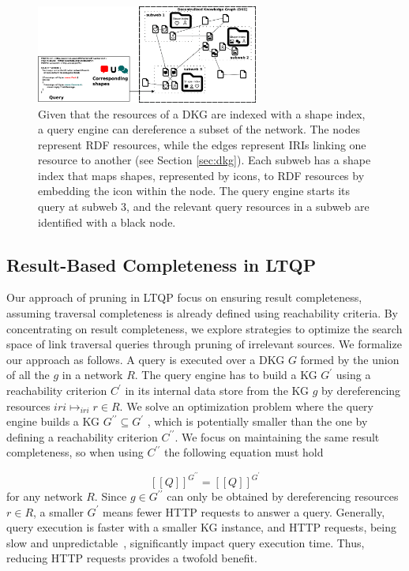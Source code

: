 \begin{figure}
   \centering
   \includegraphics[width=0.65\textwidth]{figure/dkg.png}
   \caption{
      Given that the resources of a DKG are indexed with a shape index, a query engine can dereference a subset of the network.
      The nodes represent RDF resources, while the edges represent IRIs linking one resource to another (see Section \ref{sec:dkg}).
      Each subweb has a shape index that maps shapes, represented by icons, to RDF resources by embedding the icon within the node.
      The query engine starts its query at subweb 3, and the relevant query resources in a subweb are identified with a black node.
    }
    \label{fig:dkg}
\end{figure}


\subsection{Result-Based Completeness in LTQP}\label{sec:slde}

Our approach of pruning in LTQP focus on ensuring result completeness, assuming traversal completeness is already defined using reachability criteria.
By concentrating on result completeness, we explore strategies to optimize the search space of link traversal queries through pruning of irrelevant sources.
We formalize our approach as follows.
A query is executed over a DKG $G$ formed by the union of all the $g$ in a network $R$.
The query engine has to build a KG $G^{\prime}$ using a reachability criterion $C^{\prime}$ in its internal data store from the KG $g$ by dereferencing resources $iri \mapsto_{iri} r \in R$.
We solve an optimization problem where the query engine builds a KG
$G^{\prime\prime} \subseteq G^{\prime}$
, which is potentially smaller than the one by defining a reachability criterion $C^{\prime\prime}$.
We focus on maintaining the same result completeness, so when using $C^{\prime\prime}$ the following equation must hold

\begin{equation}\label{eq:evalQueryStructuralAssumption}
   [\![ Q ]\!]^{G^{\prime\prime}} = [\![ Q ]\!]^{G^{\prime}}
\end{equation}
for any network $R$.
Since $g \in G^{\prime\prime}$ can only be obtained by dereferencing resources $r \in R$, a smaller $G^\prime$ means fewer HTTP requests to answer a query.  
Generally, query execution is faster with a smaller KG instance, and HTTP requests, being slow and unpredictable~\cite{hartig2016walking}, significantly impact query execution time.  
Thus, reducing HTTP requests provides a twofold benefit.

